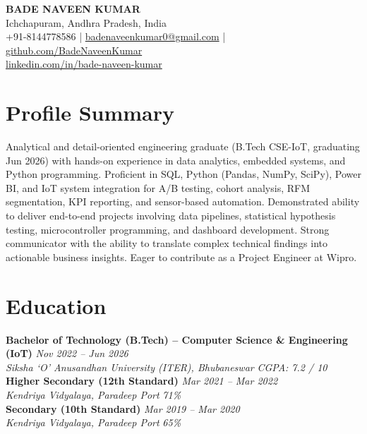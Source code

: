 \documentclass[11pt,a4paper]{article}
\newcommand{\resumeheading}[4]{%
  \noindent\textbf{#1} \hfill \textit{#2} \\
  \textit{#3} \hfill \textit{#4} \\[2pt]
}
\begin{document}
\pagestyle{empty}

\begin{center}
  {\LARGE\bfseries BADE NAVEEN KUMAR}\\[4pt]
  Ichchapuram, Andhra Pradesh, India\\[2pt]
  +91-8144778586 \;|\;
  \href{mailto:badenaveenkumar0@gmail.com}{badenaveenkumar0@gmail.com} \;|\;
  \href{https://github.com/BadeNaveenKumar}{github.com/BadeNaveenKumar}\\[2pt]
  \href{https://www.linkedin.com/in/bade-naveen-kumar}{linkedin.com/in/bade-naveen-kumar}
\end{center}

\vspace{2pt}

\section{Profile Summary}

Analytical and detail-oriented engineering graduate (B.Tech CSE-IoT, graduating Jun 2026) with hands-on
experience in data analytics, embedded systems, and Python programming. Proficient in SQL, Python
(Pandas, NumPy, SciPy), Power BI, and IoT system integration for A/B testing, cohort analysis, RFM
segmentation, KPI reporting, and sensor-based automation. Demonstrated ability to deliver end-to-end
projects involving data pipelines, statistical hypothesis testing, microcontroller programming, and
dashboard development. Strong communicator with the ability to translate complex technical findings
into actionable business insights. Eager to contribute as a Project Engineer at Wipro.

\section{Education}

\resumeheading
  {Bachelor of Technology (B.Tech) -- Computer Science \& Engineering (IoT)}
  {Nov 2022 -- Jun 2026}
  {Siksha `O' Anusandhan University (ITER), Bhubaneswar}
  {CGPA: 7.2 / 10}

\resumeheading
  {Higher Secondary (12th Standard)}
  {Mar 2021 -- Mar 2022}
  {Kendriya Vidyalaya, Paradeep Port}
  {71\%}

\resumeheading
  {Secondary (10th Standard)}
  {Mar 2019 -- Mar 2020}
  {Kendriya Vidyalaya, Paradeep Port}
  {65\%}
\end{document}
